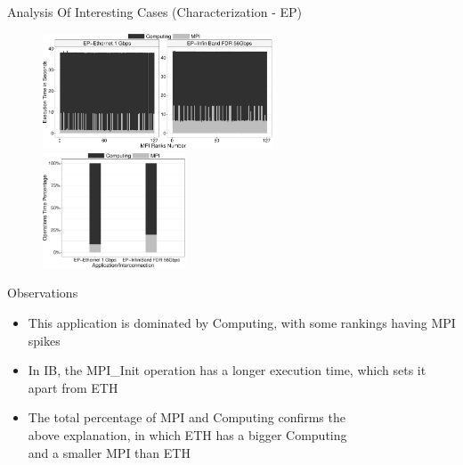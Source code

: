 \documentclass{beamer}
\begin{document}
\begin{frame}{Analysis Of Interesting Cases (Characterization - EP)}
\begin{figure}
   \includegraphics[width=0.61\textwidth]{SLIDES/img/EP.charac.pdf}
   \includegraphics[width=0.38\textwidth]{SLIDES/img/EP.percentage.pdf}
\end{figure}
Observations
\begin{itemize}
    \pause\item This application is dominated by Computing, with some rankings having MPI spikes
    \pause\item In IB, the MPI\_Init operation has a longer execution time, which sets it apart from ETH
    \pause\item The total percentage of MPI and Computing confirms the \\above explanation, in which ETH has a bigger Computing \\and a smaller MPI than ETH   
\end{itemize}

\end{frame}
\end{document}
